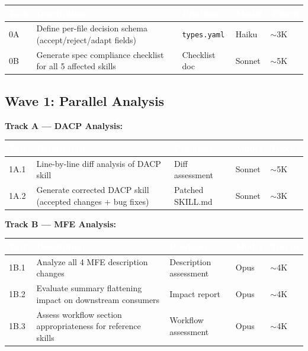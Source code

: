 \documentclass[11pt,letterpaper]{article}
\newcommand{\tableheader}[1]{\textbf{\sffamily\textcolor{white}{#1}}}
\begin{document}
\begin{center}
\begin{tabularx}{\textwidth}{C{1cm}XL{3cm}C{1.5cm}C{1.5cm}}
\toprule
{}
\tableheader{Task} & \tableheader{Description} & \tableheader{Produces} & \tableheader{Model} & \tableheader{Tokens} \\
\midrule
0A & Define per-file decision schema (accept/reject/adapt fields) & \texttt{types.yaml} & Haiku & $\sim$3K \\
0B & Generate spec compliance checklist for all 5 affected skills & Checklist doc & Sonnet & $\sim$5K \\
\bottomrule
\end{tabularx}
\end{center}

\subsection{Wave 1: Parallel Analysis}

\textbf{Track A --- DACP Analysis:}

\begin{center}
\begin{tabularx}{\textwidth}{C{1cm}XL{3cm}C{1.5cm}C{1.5cm}}
\toprule
{}
\tableheader{Task} & \tableheader{Description} & \tableheader{Produces} & \tableheader{Model} & \tableheader{Tokens} \\
\midrule
1A.1 & Line-by-line diff analysis of DACP skill & Diff assessment & Sonnet & $\sim$5K \\
1A.2 & Generate corrected DACP skill (accepted changes + bug fixes) & Patched SKILL.md & Sonnet & $\sim$3K \\
\bottomrule
\end{tabularx}
\end{center}

\textbf{Track B --- MFE Analysis:}

\begin{center}
\begin{tabularx}{\textwidth}{C{1cm}XL{3cm}C{1.5cm}C{1.5cm}}
\toprule
{}
\tableheader{Task} & \tableheader{Description} & \tableheader{Produces} & \tableheader{Model} & \tableheader{Tokens} \\
\midrule
1B.1 & Analyze all 4 MFE description changes & Description assessment & Opus & $\sim$4K \\
1B.2 & Evaluate summary flattening impact on downstream consumers & Impact report & Opus & $\sim$4K \\
1B.3 & Assess workflow section appropriateness for reference skills & Workflow assessment & Opus & $\sim$4K \\
\bottomrule
\end{tabularx}
\end{center}
\end{document}
